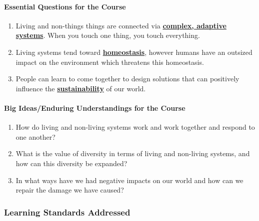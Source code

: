 \documentclass[
]{article}
\begin{document}
\hypertarget{essential-questions-for-the-course}{%
\paragraph{Essential Questions for the
Course}\label{essential-questions-for-the-course}}

\begin{enumerate}
\def\labelenumi{\arabic{enumi}.}
\item
  Living and non-things things are connected via
  \href{https://en.wikipedia.org/wiki/Complex_adaptive_system}{\textbf{complex,
  adaptive systems}}. When you touch one thing, you touch everything.
\item
  Living systems tend toward
  \href{https://en.wikipedia.org/wiki/Homeostasis}{\textbf{homeostasis}},
  however humans have an outsized impact on the environment which
  threatens this homeostasis.
\item
  People can learn to come together to design solutions that can
  positively influence the
  \href{https://www.epa.gov/sustainability/learn-about-sustainability}{\textbf{sustainability}}
  of our world.
\end{enumerate}

\hypertarget{big-ideasenduring-understandings-for-the-course}{%
\paragraph{Big Ideas/Enduring Understandings for the
Course}\label{big-ideasenduring-understandings-for-the-course}}

\begin{enumerate}
\def\labelenumi{\arabic{enumi}.}
\item
  How do living and non-living systems work and work together and
  respond to one another?
\item
  What is the value of diversity in terms of living and non-living
  systems, and how can this diversity be expanded?
\item
  In what ways have we had negative impacts on our world and how can we
  repair the damage we have caused?
\end{enumerate}

\hypertarget{learning-standards-addressed}{%
\subsubsection{Learning Standards
Addressed}\label{learning-standards-addressed}}
\end{document}
